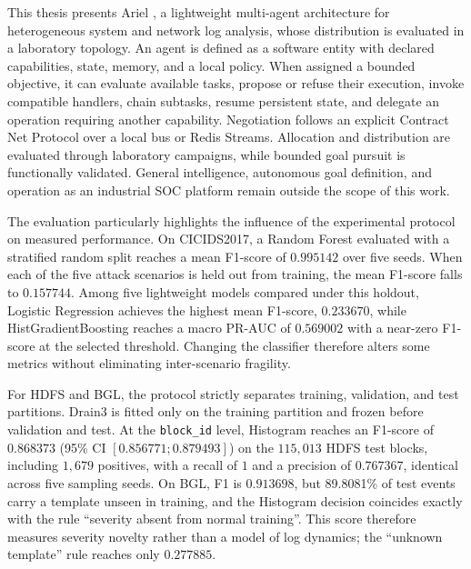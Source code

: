 
This thesis presents Ariel \logminer{}, a lightweight multi-agent architecture
for heterogeneous system and network log analysis, whose distribution is
evaluated in a laboratory topology. An agent is defined as a software entity
with declared capabilities, state, memory, and a local policy. When assigned
a bounded objective, it can evaluate available tasks, propose or refuse their
execution, invoke compatible handlers, chain subtasks, resume persistent state,
and delegate an operation requiring another capability. Negotiation follows an
explicit Contract Net Protocol over a local bus or Redis Streams. Allocation
and distribution are evaluated through laboratory campaigns, while bounded
goal pursuit is functionally validated. General intelligence, autonomous goal
definition, and operation as an industrial SOC platform remain outside the
scope of this work.

The evaluation particularly highlights the influence of the experimental
protocol on measured performance. On CICIDS2017, a Random Forest evaluated
with a stratified random split reaches a mean F1-score of $0.995142$ over five
seeds. When each of the five attack scenarios is held out from training, the
mean F1-score falls to $0.157744$. Among five lightweight models compared
under this holdout, Logistic Regression achieves the highest mean F1-score,
$0.233670$, while HistGradientBoosting reaches a macro PR-AUC of $0.569002$
with a near-zero F1-score at the selected threshold. Changing the classifier
therefore alters some metrics without eliminating inter-scenario fragility.

For HDFS and BGL, the protocol strictly separates training, validation, and
test partitions. Drain3 is fitted only on the training partition and frozen
before validation and test. At the \texttt{block\_id} level, Histogram reaches
an F1-score of $0.868373$ (95\% CI $[0.856771;0.879493]$) on the
$115{,}013$ HDFS test blocks, including $1{,}679$ positives, with a recall of
$1$ and a precision of $0.767367$, identical across five sampling seeds. On
BGL, F1 is $0.913698$, but 89.8081\% of test events carry a template unseen
in training, and the Histogram decision coincides exactly with the rule
``severity absent from normal training''. This score therefore measures
severity novelty rather than a model of log dynamics; the ``unknown
template'' rule reaches only $0.277885$.

